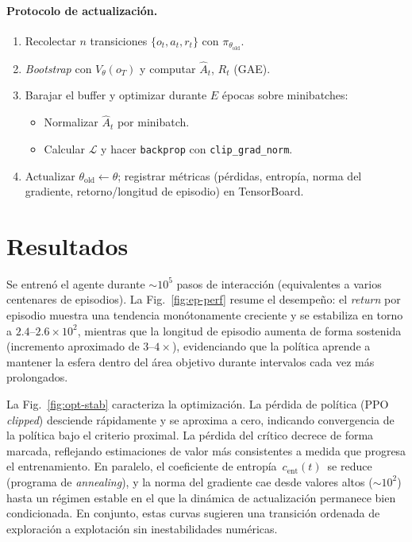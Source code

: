 \documentclass[conference]{IEEEtran}
\begin{document}
\paragraph{Protocolo de actualización.}
\begin{enumerate}
\item Recolectar $n$ transiciones $\{o_t,a_t,r_t\}$ con $\pi_{\theta_{\mathrm{old}}}$.
\item \textit{Bootstrap} con $V_\theta(o_{T})$ y computar $\hat A_t$, $R_t$ (GAE).
\item Barajar el buffer y optimizar durante $E$ épocas sobre mini\-batches:
  \begin{itemize}
  \item Normalizar $\hat A_t$ por minibatch.
  \item Calcular $\mathcal{L}$ y hacer \texttt{backprop} con \texttt{clip\_grad\_norm}.
  \end{itemize}
\item Actualizar $\theta_{\mathrm{old}}\!\leftarrow\!\theta$; registrar métricas (pérdidas, entropía, norma del gradiente, retorno/longitud de episodio) en TensorBoard.
\end{enumerate}


\section{Resultados}
Se entrenó el agente durante \(\sim 10^5\) pasos de interacción (equivalentes a varios centenares de episodios). La Fig.~\ref{fig:ep-perf} resume el desempeño: el \emph{return} por episodio muestra una tendencia monótonamente creciente y se estabiliza en torno a \(2.4\text{–}2.6\times 10^2\), mientras que la longitud de episodio aumenta de forma sostenida (incremento aproximado de \(3\text{–}4\times\)), evidenciando que la política aprende a mantener la esfera dentro del área objetivo durante intervalos cada vez más prolongados.

La Fig.~\ref{fig:opt-stab} caracteriza la optimización. La pérdida de política (PPO \emph{clipped}) desciende rápidamente y se aproxima a cero, indicando convergencia de la política bajo el criterio proximal. La pérdida del crítico decrece de forma marcada, reflejando estimaciones de valor más consistentes a medida que progresa el entrenamiento. En paralelo, el coeficiente de entropía \(\,c_{\mathrm{ent}}(t)\,\) se reduce (programa de \emph{annealing}), y la norma del gradiente cae desde valores altos (\(\sim 10^2\)) hasta un régimen estable en el que la dinámica de actualización permanece bien condicionada. En conjunto, estas curvas sugieren una transición ordenada de exploración a explotación sin inestabilidades numéricas.
\end{document}
